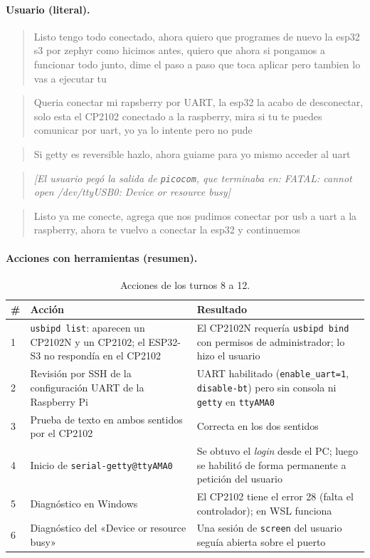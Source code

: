 \documentclass[12pt,a4paper]{article}
\begin{document}
\paragraph{Usuario (literal).}
\begin{quote}
Listo tengo todo conectado, ahora quiero que programes de nuevo la esp32 s3 por zephyr como hicimos antes, quiero que ahora si pongamos a funcionar todo junto, dime el paso a paso que toca aplicar pero tambien lo vas a ejecutar tu
\end{quote}
\begin{quote}
Queria conectar mi rapsberry por UART, la esp32 la acabo de desconectar, solo esta el CP2102 conectado a la raspberry, mira si tu te puedes comunicar por uart, yo ya lo intente pero no pude
\end{quote}
\begin{quote}
Si getty es reversible hazlo, ahora guiame para yo mismo acceder al uart
\end{quote}
\begin{quote}
\textit{[El usuario pegó la salida de \texttt{picocom}, que terminaba en: FATAL: cannot open /dev/ttyUSB0: Device or resource busy]}
\end{quote}
\begin{quote}
Listo ya me conecte, agrega que nos pudimos conectar por usb a uart a la raspberry, ahora te vuelvo a conectar la esp32 y continuemos
\end{quote}

\paragraph{Acciones con herramientas (resumen).}

\begin{table}[H]
\centering
\small
\begin{tabular}{@{}p{0.6cm} p{7.2cm} p{7.2cm}@{}}
\toprule
\textbf{\#} & \textbf{Acción} & \textbf{Resultado} \\
\midrule
1 & \texttt{usbipd list}: aparecen un CP2102N y un CP2102; el ESP32-S3 no respondía en el CP2102 & El CP2102N requería \texttt{usbipd bind} con permisos de administrador; lo hizo el usuario \\
2 & Revisión por SSH de la configuración UART de la Raspberry Pi & UART habilitado (\texttt{enable\_uart=1}, \texttt{disable-bt}) pero sin consola ni \texttt{getty} en \texttt{ttyAMA0} \\
3 & Prueba de texto en ambos sentidos por el CP2102 & Correcta en los dos sentidos \\
4 & Inicio de \texttt{serial-getty@ttyAMA0} & Se obtuvo el \emph{login} desde el PC; luego se habilitó de forma permanente a petición del usuario \\
5 & Diagnóstico en Windows & El CP2102 tiene el error 28 (falta el controlador); en WSL funciona \\
6 & Diagnóstico del «Device or resource busy» & Una sesión de \texttt{screen} del usuario seguía abierta sobre el puerto \\
\bottomrule
\end{tabular}
\caption{Acciones de los turnos 8 a 12.}
\end{table}
\end{document}
